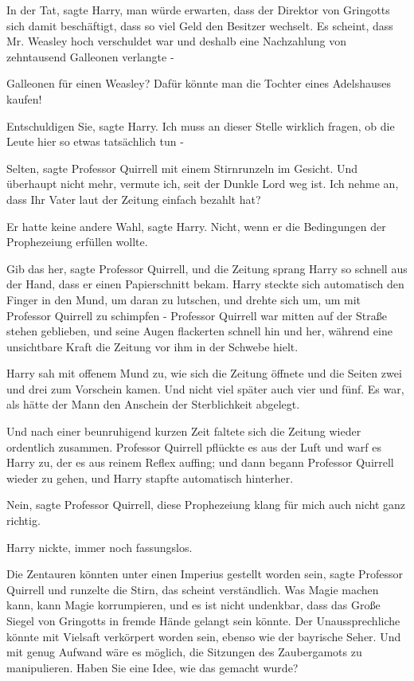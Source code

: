\glqq In der Tat\grqq{}, sagte Harry, \glqq man würde erwarten, dass der
Direktor von Gringotts sich damit beschäftigt, dass so viel Geld den Besitzer
wechselt. Es scheint, dass Mr. Weasley hoch verschuldet war und deshalb eine
Nachzahlung von zehntausend Galleonen verlangte -\grqq{}

 Galleonen für einen Weasley? Dafür könnte man die Tochter eines
Adelshauses kaufen!\grqq{}

\glqq Entschuldigen Sie\grqq{}, sagte Harry. \glqq Ich muss an dieser Stelle
wirklich fragen, ob die Leute hier so etwas tatsächlich tun -\grqq{}

\glqq Selten\grqq{}, sagte Professor Quirrell mit einem Stirnrunzeln im Gesicht.
\glqq Und überhaupt nicht mehr, vermute ich, seit der Dunkle Lord weg ist. Ich
nehme an, dass Ihr Vater laut der Zeitung einfach bezahlt hat?\grqq{}

\glqq Er hatte keine andere Wahl\grqq{}, sagte Harry. \glqq Nicht, wenn er die
Bedingungen der Prophezeiung erfüllen wollte.\grqq{}

\glqq Gib das her\grqq{}, sagte Professor Quirrell, und die Zeitung sprang Harry
so schnell aus der Hand, dass er einen Papierschnitt bekam. Harry steckte sich
automatisch den Finger in den Mund, um daran zu lutschen, und drehte sich um, um
mit Professor Quirrell zu schimpfen - Professor Quirrell war mitten auf der
Straße stehen geblieben, und seine Augen flackerten schnell hin und her, während
eine unsichtbare Kraft die Zeitung vor ihm in der Schwebe hielt.

Harry sah mit offenem Mund zu, wie sich die Zeitung öffnete und die Seiten zwei
und drei zum Vorschein kamen. Und nicht viel später auch vier und fünf. Es war,
als hätte der Mann den Anschein der Sterblichkeit abgelegt.

Und nach einer beunruhigend kurzen Zeit faltete sich die Zeitung wieder
ordentlich zusammen. Professor Quirrell pflückte es aus der Luft und warf es
Harry zu, der es aus reinem Reflex auffing; und dann begann Professor Quirrell
wieder zu gehen, und Harry stapfte automatisch hinterher.

\glqq Nein\grqq{}, sagte Professor Quirrell, \glqq diese Prophezeiung klang für
mich auch nicht ganz richtig.\grqq{}

Harry nickte, immer noch fassungslos.

\glqq Die Zentauren könnten unter einen Imperius gestellt worden sein\grqq{},
sagte Professor Quirrell und runzelte die Stirn, \glqq das scheint verständlich.
Was Magie machen kann, kann Magie korrumpieren, und es ist nicht undenkbar, dass
das Große Siegel von Gringotts in fremde Hände gelangt sein könnte. Der
Unaussprechliche könnte mit Vielsaft verkörpert worden sein, ebenso wie der
bayrische Seher. Und mit genug Aufwand wäre es möglich, die Sitzungen des
Zaubergamots zu manipulieren. Haben Sie eine Idee, wie das gemacht wurde?\grqq{}

